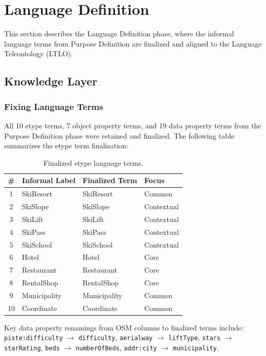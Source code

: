 \section{Language Definition}

This section describes the Language Definition phase, where the informal language terms from Purpose Definition are finalized and aligned to the Language Teleontology (LTLO).

\subsection{Knowledge Layer}

\subsubsection{Fixing Language Terms}

All 10 etype terms, 7 object property terms, and 19 data property terms from the Purpose Definition phase were retained and finalized. The following table summarizes the etype term finalization:

\begin{table}[h!]
\centering
\small
\begin{tabular}{|c|l|l|l|}
\hline
\textbf{\#} & \textbf{Informal Label} & \textbf{Finalized Term} & \textbf{Focus} \\
\hline
1 & SkiResort & SkiResort & Common \\
2 & SkiSlope & SkiSlope & Contextual \\
3 & SkiLift & SkiLift & Contextual \\
4 & SkiPass & SkiPass & Contextual \\
5 & SkiSchool & SkiSchool & Contextual \\
6 & Hotel & Hotel & Core \\
7 & Restaurant & Restaurant & Core \\
8 & RentalShop & RentalShop & Core \\
9 & Municipality & Municipality & Common \\
10 & Coordinate & Coordinate & Common \\
\hline
\end{tabular}
\caption{Finalized etype language terms.}
\end{table}

Key data property renamings from OSM columns to finalized terms include: \texttt{piste:difficulty} $\rightarrow$ \texttt{difficulty}, \texttt{aerialway} $\rightarrow$ \texttt{liftType}, \texttt{stars} $\rightarrow$ \texttt{starRating}, \texttt{beds} $\rightarrow$ \texttt{numberOfBeds}, \texttt{addr:city} $\rightarrow$ \texttt{municipality}.

